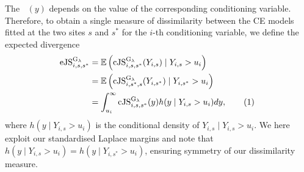 \documentclass[12pt]{article}
\newcommand{\JSGa}{\mathop{\mathrm{JS}^{\mathrm{G}_{\lambda}}}\nolimits}
\newcommand{\cJSGa}[1]{\mathop{\mathrm{cJS}_{i, #1}^{\mathrm{G}_{\lambda}}}\nolimits}
\newcommand{\eJSGa}[1]{\mathop{\mathrm{eJS}_{i, #1}^{\mathrm{G}_{\lambda}}}\nolimits}
\newcommand\numberthis{\addtocounter{equation}{1}\tag{\theequation}}
\begin{document}
The $\cJSGa{s, s^*}(y)$ depends on the value of the corresponding conditioning variable. 
Therefore, to obtain a single measure of dissimilarity between the CE models fitted at the two sites $s$ and $s^*$ for the $i$-th conditioning variable, we define the expected divergence
\begin{align*}%
  \eJSGa{s, s^*} &= \mathbb{E}\left(\cJSGa{s, s^*}(Y_{i,s}) \mid Y_{i,s} > u_i\right) \\
                 &= \mathbb{E}\left(\cJSGa{s^*, s}(Y_{i,s^*}) \mid Y_{i,s^*} > u_i\right) \\
                 &= \int_{u_i}^{\infty} \cJSGa{s, s^*}(y) h(y \mid Y_{i,s} > u_i) dy, \numberthis~\label{eq:jsga_integral}
\end{align*}
where $h(y \mid Y_{i, s} > u_i)$ is the conditional density of $Y_{i, s} \mid Y_{i, s} > u_i$.
We here exploit our standardised Laplace margins and note that $h(y \mid Y_{i, s} > u_i) = h(y \mid Y_{i, s^*} > u_i)$, ensuring symmetry of our dissimilarity measure.
\end{document}
